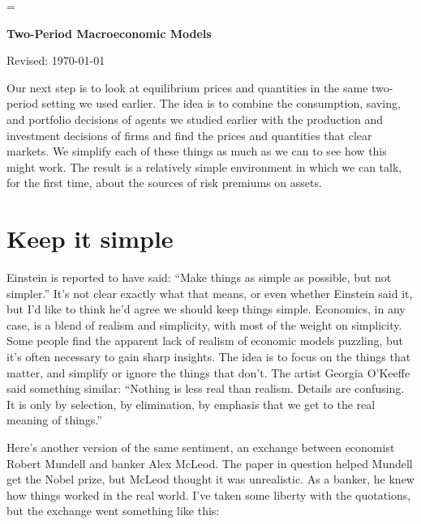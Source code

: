 \documentclass[11pt]{article}
\begin{document}
\parskip=\bigskipamount
\parindent=0.0in
\thispagestyle{empty}


\bigskip\bigskip
\centerline{\Large \bf Two-Period Macroeconomic Models}
\centerline{Revised: \today}

\bigskip
Our next step is to look at equilibrium prices and quantities
in the same two-period setting we used earlier.
The idea is to combine the consumption,
saving, and portfolio decisions of agents we studied earlier
with the production and investment decisions of firms
and find the prices and quantities that clear markets.
We simplify each of these things as much as we can
to see how this might work.
The result is a relatively simple environment in which
we can talk, for the first time, about the sources
of risk premiums on assets.

\section{Keep it simple}

Einstein is reported to have said:
``Make things as simple as possible, but not simpler.''
It's not clear exactly what that means, or even whether Einstein said it,
but I'd like to think he'd agree we should keep things simple.
Economics, in any case, is a blend of realism and simplicity,
with most of the weight on simplicity.
Some people find the apparent lack of realism of economic models puzzling,
but it's often necessary to gain sharp insights.
The idea is to focus on the things that matter,
and simplify or ignore the things that don't.
The artist Georgia O'Keeffe said something similar:
``Nothing is less real than realism. Details are confusing. It is only by
selection, by elimination, by emphasis that we get to the real meaning of
things.''

Here's another version of the same sentiment,
an exchange between economist Robert Mundell and banker Alex McLeod.
The paper in question helped Mundell get the Nobel prize,
but McLeod thought it was unrealistic.
As a banker, he knew how things worked in the real world.
I've taken some liberty with the quotations, but the exchange went something like this:
\end{document}
